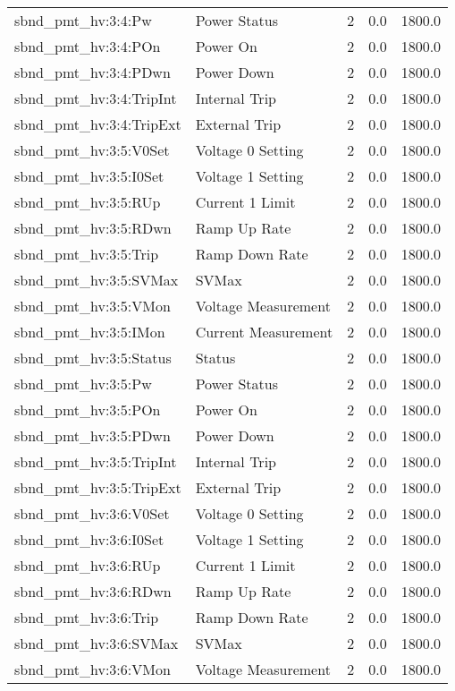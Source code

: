 \begin{center}
\begin{longtable}{l | l l l l }
sbnd\_pmt\_hv:3:4:Pw & Power Status & 2 & 0.0 & 1800.0\\ 
sbnd\_pmt\_hv:3:4:POn & Power On & 2 & 0.0 & 1800.0\\ 
sbnd\_pmt\_hv:3:4:PDwn & Power Down & 2 & 0.0 & 1800.0\\ 
sbnd\_pmt\_hv:3:4:TripInt & Internal Trip & 2 & 0.0 & 1800.0\\ 
sbnd\_pmt\_hv:3:4:TripExt & External Trip & 2 & 0.0 & 1800.0\\ 
sbnd\_pmt\_hv:3:5:V0Set & Voltage 0 Setting & 2 & 0.0 & 1800.0\\ 
sbnd\_pmt\_hv:3:5:I0Set & Voltage 1 Setting & 2 & 0.0 & 1800.0\\ 
sbnd\_pmt\_hv:3:5:RUp & Current 1 Limit & 2 & 0.0 & 1800.0\\ 
sbnd\_pmt\_hv:3:5:RDwn & Ramp Up Rate & 2 & 0.0 & 1800.0\\ 
sbnd\_pmt\_hv:3:5:Trip & Ramp Down Rate & 2 & 0.0 & 1800.0\\ 
sbnd\_pmt\_hv:3:5:SVMax & SVMax & 2 & 0.0 & 1800.0\\ 
sbnd\_pmt\_hv:3:5:VMon & Voltage Measurement & 2 & 0.0 & 1800.0\\ 
sbnd\_pmt\_hv:3:5:IMon & Current Measurement & 2 & 0.0 & 1800.0\\ 
sbnd\_pmt\_hv:3:5:Status & Status & 2 & 0.0 & 1800.0\\ 
sbnd\_pmt\_hv:3:5:Pw & Power Status & 2 & 0.0 & 1800.0\\ 
sbnd\_pmt\_hv:3:5:POn & Power On & 2 & 0.0 & 1800.0\\ 
sbnd\_pmt\_hv:3:5:PDwn & Power Down & 2 & 0.0 & 1800.0\\ 
sbnd\_pmt\_hv:3:5:TripInt & Internal Trip & 2 & 0.0 & 1800.0\\ 
sbnd\_pmt\_hv:3:5:TripExt & External Trip & 2 & 0.0 & 1800.0\\ 
sbnd\_pmt\_hv:3:6:V0Set & Voltage 0 Setting & 2 & 0.0 & 1800.0\\ 
sbnd\_pmt\_hv:3:6:I0Set & Voltage 1 Setting & 2 & 0.0 & 1800.0\\ 
sbnd\_pmt\_hv:3:6:RUp & Current 1 Limit & 2 & 0.0 & 1800.0\\ 
sbnd\_pmt\_hv:3:6:RDwn & Ramp Up Rate & 2 & 0.0 & 1800.0\\ 
sbnd\_pmt\_hv:3:6:Trip & Ramp Down Rate & 2 & 0.0 & 1800.0\\ 
sbnd\_pmt\_hv:3:6:SVMax & SVMax & 2 & 0.0 & 1800.0\\ 
sbnd\_pmt\_hv:3:6:VMon & Voltage Measurement & 2 & 0.0 & 1800.0\\ 

\end{longtable}
\end{center}
